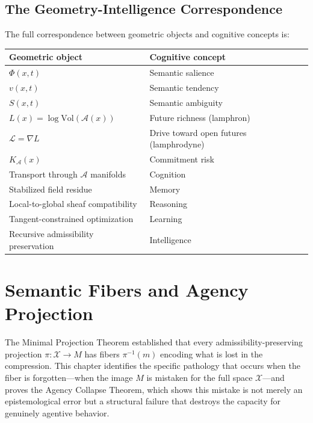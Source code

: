 \documentclass[12pt, oneside]{book}
\theoremstyle{flyxion}
\theoremstyle{definition}
\begin{document}
\section{The Geometry-Intelligence Correspondence}

The full correspondence between geometric objects and
cognitive concepts is:

\begin{center}
\renewcommand{\arraystretch}{1.4}
\begin{tabular}{ll}
\toprule
Geometric object & Cognitive concept \\
\midrule
$\Phi(x,t)$ & Semantic salience \\
$v(x,t)$ & Semantic tendency \\
$S(x,t)$ & Semantic ambiguity \\
$L(x) = \log\mathrm{Vol}(\mathcal{A}(x))$ &
  Future richness (lamphron) \\
$\mathcal{L} = \nabla L$ & Drive toward open futures
  (lamphrodyne) \\
$K_\mathcal{A}(x)$ & Commitment risk \\
Transport through $\mathcal{A}$ manifolds & Cognition \\
Stabilized field residue & Memory \\
Local-to-global sheaf compatibility & Reasoning \\
Tangent-constrained optimization & Learning \\
Recursive admissibility preservation & Intelligence \\
\bottomrule
\end{tabular}
\end{center}

\chapter{Semantic Fibers and Agency Projection}

The Minimal Projection Theorem established that every
admissibility-preserving projection $\pi : \mathcal{X}
\to M$ has fibers $\pi^{-1}(m)$ encoding what is lost
in the compression. This chapter identifies the specific
pathology that occurs when the fiber is forgotten---when
the image $M$ is mistaken for the full space
$\mathcal{X}$---and proves the Agency Collapse Theorem,
which shows this mistake is not merely an
epistemological error but a structural failure that
destroys the capacity for genuinely agentive behavior.
\end{document}
